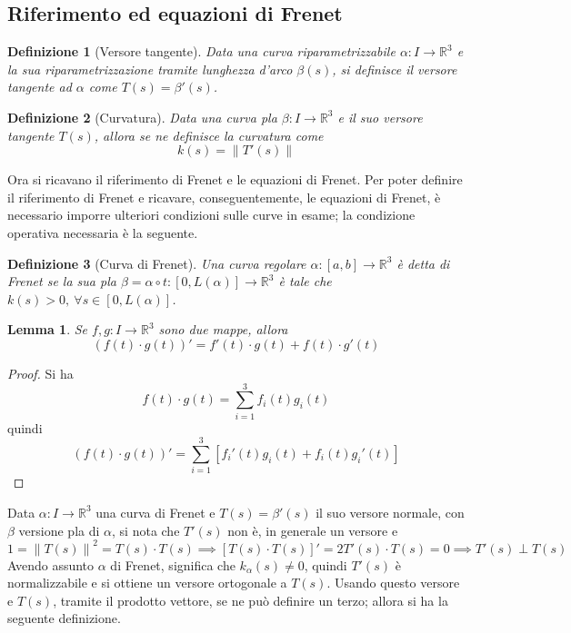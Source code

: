 \documentclass[12pt]{article}
\theoremstyle{style}
\newtheorem{definizione}{Definizione}[section]
\newtheorem{lemma}{Lemma}[teorema]
\numberwithin{equation}{subsection}
\begin{document}
\subsection{Riferimento ed equazioni di Frenet}
\begin{definizione}
	[Versore tangente]
	Data una curva riparametrizzabile $\alpha :I \to \mathbb{R}^3$ e la sua riparametrizzazione tramite lunghezza d'arco $\beta (s)$, si definisce il \textit{versore tangente} ad $\alpha $ come $T(s) = \beta '(s)$.
\end{definizione}
\begin{definizione}
	[Curvatura]
	Data una curva pla $\beta :I\to \mathbb{R}^3$ e il suo versore tangente $T(s)$, allora se ne definisce la \textit{curvatura} come
	\[
	k (s) = \left\lVert T'(s) \right\rVert 
	\] 
\end{definizione}
\noindent Ora si ricavano il riferimento di Frenet e le equazioni di Frenet.
Per poter definire il riferimento di Frenet e ricavare, conseguentemente, le equazioni di Frenet, \`e necessario imporre ulteriori condizioni sulle curve in esame; la condizione operativa necessaria \`e la seguente.
\begin{definizione}
	[Curva di Frenet]
	Una curva regolare $\alpha:[a,b]\to\mathbb{R}^3 $ \`e detta \textit{di Frenet} se la sua pla $\beta = \alpha  \circ t:[0,L(\alpha )]\to \mathbb{R}^3$ \`e tale che $k(s) >0, \ \forall s \in [0,L(\alpha )]$.
\end{definizione}
\begin{lemma}\label{lemdif}
	Se $f, g : I \to \mathbb{R}^{3} $ sono due mappe, allora 
	\[
	\left(f(t)\cdot g(t)\right) ' = f'(t) \cdot g(t) + f(t) \cdot g'(t)
	\] 
\end{lemma}
	\begin{proof}
		Si ha
		\[
		f(t) \cdot g(t) = \sum_{i=1}^{3} f_i(t) g_i(t)
		\] 
	quindi
	\[
	\left(f(t)\cdot g(t)\right) ' = \sum_{i=1}^{3} \left[ f_i'(t)g_i(t) + f_i(t) g_i'(t) \right] 
	\] 
	\end{proof}
\noindent Data $\alpha : I \to \mathbb{R}^3$ una curva di Frenet e $T(s) = \beta '(s)	$ il suo versore normale, con $\beta $ versione pla di $\alpha $, si nota che $T'(s)$ non \`e, in generale un versore e 
\[
1 = \left\lVert T(s) \right\rVert ^2 = T(s) \cdot T(s) \implies \left[ T(s) \cdot T(s) \right] ' = 2T'(s) \cdot T(s) = 0 \implies T'(s) \perp T(s) 
\] 
Avendo assunto $\alpha $ di Frenet, significa che $k_\alpha  (s) \neq 0$, quindi $T'(s)$ \`e normalizzabile e si ottiene un versore ortogonale a $T(s)$.
Usando questo versore e $T(s)$, tramite il prodotto vettore, se ne pu\`o definire un terzo; allora si ha la seguente definizione.
\end{document}
